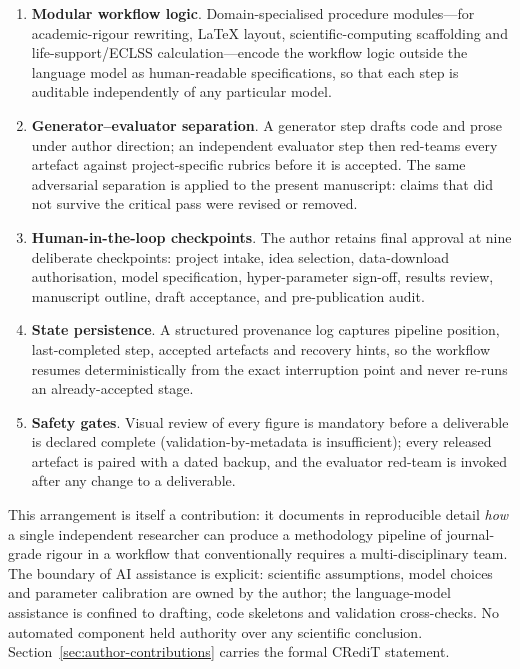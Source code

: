 \documentclass[11pt,a4paper,3p,authoryear]{elsarticle}
\begin{document}
\begin{enumerate}
\item \textbf{Modular workflow logic}. Domain-specialised procedure modules---for academic-rigour rewriting, \LaTeX{} layout, scientific-computing scaffolding and life-support/ECLSS calculation---encode the workflow logic outside the language model as human-readable specifications, so that each step is auditable independently of any particular model.
\item \textbf{Generator--evaluator separation}. A generator step drafts code and prose under author direction; an independent evaluator step then red-teams every artefact against project-specific rubrics before it is accepted. The same adversarial separation is applied to the present manuscript: claims that did not survive the critical pass were revised or removed.
\item \textbf{Human-in-the-loop checkpoints}. The author retains final approval at nine deliberate checkpoints: project intake, idea selection, data-download authorisation, model specification, hyper-parameter sign-off, results review, manuscript outline, draft acceptance, and pre-publication audit.
\item \textbf{State persistence}. A structured provenance log captures pipeline position, last-completed step, accepted artefacts and recovery hints, so the workflow resumes deterministically from the exact interruption point and never re-runs an already-accepted stage.
\item \textbf{Safety gates}. Visual review of every figure is mandatory before a deliverable is declared complete (validation-by-metadata is insufficient); every released artefact is paired with a dated backup, and the evaluator red-team is invoked after any change to a deliverable.
\end{enumerate}

This arrangement is itself a contribution: it documents in reproducible detail \emph{how} a single independent researcher can produce a methodology pipeline of journal-grade rigour in a workflow that conventionally requires a multi-disciplinary team. The boundary of AI assistance is explicit: scientific assumptions, model choices and parameter calibration are owned by the author; the language-model assistance is confined to drafting, code skeletons and validation cross-checks. No automated component held authority over any scientific conclusion. Section~\ref{sec:author-contributions} carries the formal CRediT statement.
\end{document}
